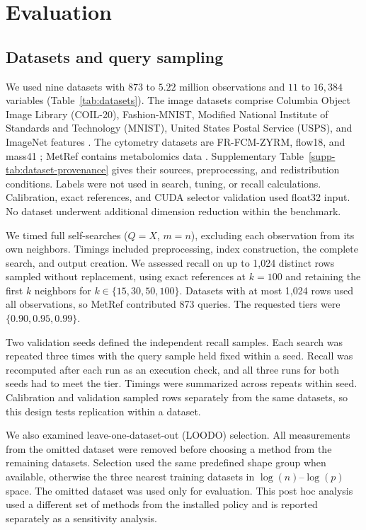 \documentclass[article]{jss}
\begin{document}
\section{Evaluation} \label{sec:evaluation}

\subsection{Datasets and query sampling}

We used nine datasets with $873$ to $5.22$ million observations and $11$ to
$16,384$ variables (Table~\ref{tab:datasets}). The image datasets comprise
Columbia Object Image Library (COIL-20), Fashion-MNIST, Modified National
Institute of Standards and Technology (MNIST), United States Postal Service
(USPS), and ImageNet features
\citep{Nene1996,Xiao2017,LeCun1998,YouShung2022,Hull1994,
Russakovsky2015,Oquab2024}. The cytometry datasets are FR-FCM-ZYRM, flow18,
and mass41 \citep{VanUnen2017,Belkina2019}; MetRef contains metabolomics data
\citep{Cacciatore2014}. Supplementary Table~\ref{supp-tab:dataset-provenance}
gives their sources, preprocessing, and redistribution conditions. Labels
were not used in search, tuning, or recall calculations. Calibration,
exact references, and CUDA selector validation used float32 input. No dataset
underwent additional dimension reduction within the benchmark.

We timed full self-searches ($Q=X$, $m=n$), excluding each observation from
its own neighbors. Timings included preprocessing, index construction, the
complete search, and output creation. We assessed recall on up to 1,024
distinct rows sampled without replacement, using exact references at $k=100$
and retaining the first $k$ neighbors for $k\in\{15,30,50,100\}$. Datasets
with at most 1,024 rows used all observations, so MetRef contributed 873
queries. The requested tiers were $\{0.90,0.95,0.99\}$.

Two validation seeds defined the independent recall samples. Each search was
repeated three times with the query sample held fixed within a seed. Recall was
recomputed after each run as an execution check, and all three runs for both
seeds had to meet the tier. Timings were summarized across repeats within seed.
Calibration and validation sampled rows separately from the same datasets, so
this design tests replication within a dataset.

We also examined leave-one-dataset-out (LOODO) selection. All measurements
from the omitted dataset were removed before choosing a method from the
remaining datasets. Selection used the same predefined shape group when
available, otherwise the three nearest training datasets in
$\log(n)$--$\log(p)$ space. The omitted dataset was used only for evaluation.
This post hoc analysis used a different set of methods from the installed
policy and is reported separately as a sensitivity analysis.
\end{document}
